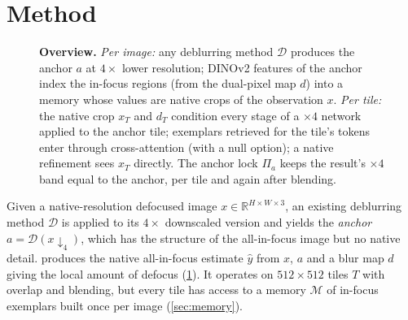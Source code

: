 \section{Method}
\label{sec:method}

\begin{figure}[t]
  \centering
  \resizebox{\textwidth}{!}{}
  \caption{\textbf{Overview.} \emph{Per image:} any deblurring method $\mathcal{D}$ produces the anchor $a$ at
  $4\times$ lower resolution; DINOv2 features of the anchor index the in-focus regions (from the dual-pixel map $d$)
  into a memory whose values are native crops of the observation $x$. \emph{Per tile:} the native crop $x_T$ and
  $d_T$ condition every stage of a $\times4$ network applied to the anchor tile; exemplars retrieved for the tile's
  tokens enter through cross-attention (with a null option); a native refinement sees $x_T$ directly. The anchor lock
  $\Pi_a$ keeps the result's $\times4$ band equal to the anchor, per tile and again after blending.}
  \label{fig:method}
\end{figure}

Given a native-resolution defocused image $x \in \mathbb{R}^{H\times W\times 3}$, an existing deblurring
method $\mathcal{D}$ is applied to its $4\times$ downscaled version and yields the \emph{anchor}
$a = \mathcal{D}(x{\downarrow_4})$, which has the structure of the all-in-focus image but no native
detail. \method produces the native all-in-focus estimate $\hat{y}$ from $x$, $a$ and a blur map $d$
giving the local amount of defocus (\cref{fig:method}). It operates on $512\times512$ tiles $T$ with overlap and blending,
but every tile has access to a memory $\mathcal{M}$ of in-focus exemplars built once per image
(\cref{sec:memory}).

